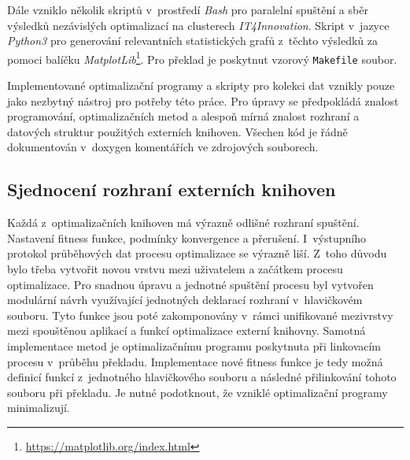 Dále vzniklo několik skriptů v~prostředí \emph{Bash} pro paralelní spuštění a sběr výsledků nezávislých optimalizací na clusterech \emph{IT4Innovation}. Skript v~jazyce \emph{Python3} pro generování relevantních statistických grafů z~těchto výsledků za pomoci balíčku \emph{MatplotLib}\footnote{\url{https://matplotlib.org/index.html}}. Pro překlad je poskytnut vzorový \texttt{Makefile} soubor. 

Implementované optimalizační programy a skripty pro kolekci dat vznikly pouze jako nezbytný nástroj pro potřeby této práce. Pro úpravy se předpokládá znalost programování, optimalizačních metod a alespoň mírná znalost rozhraní a datových struktur použitých externích knihoven. Všechen kód je řádně dokumentován v~doxygen komentářích ve zdrojových souborech.

\subsection{Sjednocení rozhraní externích knihoven}
Každá z~optimalizačních knihoven má výrazně odlišné rozhraní spuštění. Nastavení fitness funkce, podmínky konvergence a přerušení. I~výstupního protokol průběhových dat procesu optimalizace se výrazně liší. Z~toho důvodu bylo třeba vytvořit novou vrstvu mezi uživatelem a začátkem procesu optimalizace. Pro snadnou úpravu a jednotné spuštění procesu byl vytvořen modulární návrh využívající jednotných deklarací rozhraní v~hlavičkovém souboru. Tyto funkce jsou poté zakomponovány v~rámci unifikované mezivrstvy mezi spouštěnou aplikací a funkcí optimalizace externí knihovny. Samotná implementace metod je optimalizačnímu programu poskytnuta při linkovacím procesu v~průběhu překladu. Implementace nové fitness funkce je tedy možná definicí funkcí z~jednotného hlavičkového souboru a následné přilinkování tohoto souboru při překladu. Je nutné podotknout, že vzniklé optimalizační programy minimalizují.

